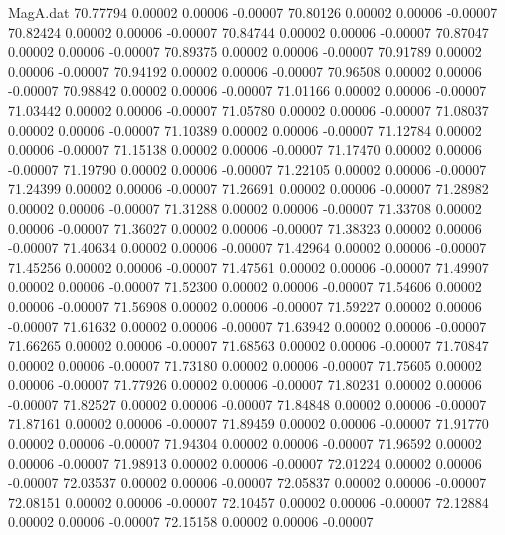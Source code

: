 \begin{filecontents}{MagA.dat}
  70.77794    0.00002    0.00006   -0.00007
  70.80126    0.00002    0.00006   -0.00007
  70.82424    0.00002    0.00006   -0.00007
  70.84744    0.00002    0.00006   -0.00007
  70.87047    0.00002    0.00006   -0.00007
  70.89375    0.00002    0.00006   -0.00007
  70.91789    0.00002    0.00006   -0.00007
  70.94192    0.00002    0.00006   -0.00007
  70.96508    0.00002    0.00006   -0.00007
  70.98842    0.00002    0.00006   -0.00007
  71.01166    0.00002    0.00006   -0.00007
  71.03442    0.00002    0.00006   -0.00007
  71.05780    0.00002    0.00006   -0.00007
  71.08037    0.00002    0.00006   -0.00007
  71.10389    0.00002    0.00006   -0.00007
  71.12784    0.00002    0.00006   -0.00007
  71.15138    0.00002    0.00006   -0.00007
  71.17470    0.00002    0.00006   -0.00007
  71.19790    0.00002    0.00006   -0.00007
  71.22105    0.00002    0.00006   -0.00007
  71.24399    0.00002    0.00006   -0.00007
  71.26691    0.00002    0.00006   -0.00007
  71.28982    0.00002    0.00006   -0.00007
  71.31288    0.00002    0.00006   -0.00007
  71.33708    0.00002    0.00006   -0.00007
  71.36027    0.00002    0.00006   -0.00007
  71.38323    0.00002    0.00006   -0.00007
  71.40634    0.00002    0.00006   -0.00007
  71.42964    0.00002    0.00006   -0.00007
  71.45256    0.00002    0.00006   -0.00007
  71.47561    0.00002    0.00006   -0.00007
  71.49907    0.00002    0.00006   -0.00007
  71.52300    0.00002    0.00006   -0.00007
  71.54606    0.00002    0.00006   -0.00007
  71.56908    0.00002    0.00006   -0.00007
  71.59227    0.00002    0.00006   -0.00007
  71.61632    0.00002    0.00006   -0.00007
  71.63942    0.00002    0.00006   -0.00007
  71.66265    0.00002    0.00006   -0.00007
  71.68563    0.00002    0.00006   -0.00007
  71.70847    0.00002    0.00006   -0.00007
  71.73180    0.00002    0.00006   -0.00007
  71.75605    0.00002    0.00006   -0.00007
  71.77926    0.00002    0.00006   -0.00007
  71.80231    0.00002    0.00006   -0.00007
  71.82527    0.00002    0.00006   -0.00007
  71.84848    0.00002    0.00006   -0.00007
  71.87161    0.00002    0.00006   -0.00007
  71.89459    0.00002    0.00006   -0.00007
  71.91770    0.00002    0.00006   -0.00007
  71.94304    0.00002    0.00006   -0.00007
  71.96592    0.00002    0.00006   -0.00007
  71.98913    0.00002    0.00006   -0.00007
  72.01224    0.00002    0.00006   -0.00007
  72.03537    0.00002    0.00006   -0.00007
  72.05837    0.00002    0.00006   -0.00007
  72.08151    0.00002    0.00006   -0.00007
  72.10457    0.00002    0.00006   -0.00007
  72.12884    0.00002    0.00006   -0.00007
  72.15158    0.00002    0.00006   -0.00007

\end{filecontents}
